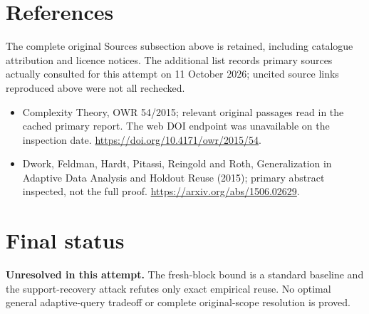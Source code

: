 \documentclass[11pt]{article}
\begin{document}
\section{References}
The complete original Sources subsection above is retained, including catalogue attribution and licence notices. The additional list records primary sources actually consulted for this attempt on 11 October 2026; uncited source links reproduced above were not all rechecked.
\begin{itemize}
\item Complexity Theory, OWR 54/2015; relevant original passages read in the cached primary report. The web DOI endpoint was unavailable on the inspection date. \url{https://doi.org/10.4171/owr/2015/54}.
\item Dwork, Feldman, Hardt, Pitassi, Reingold and Roth, Generalization in Adaptive Data Analysis and Holdout Reuse (2015); primary abstract inspected, not the full proof. \url{https://arxiv.org/abs/1506.02629}.
\end{itemize}
\section{Final status}
\textbf{Unresolved in this attempt.} The fresh-block bound is a standard baseline and the support-recovery attack refutes only exact empirical reuse. No optimal general adaptive-query tradeoff or complete original-scope resolution is proved.
\end{document}
